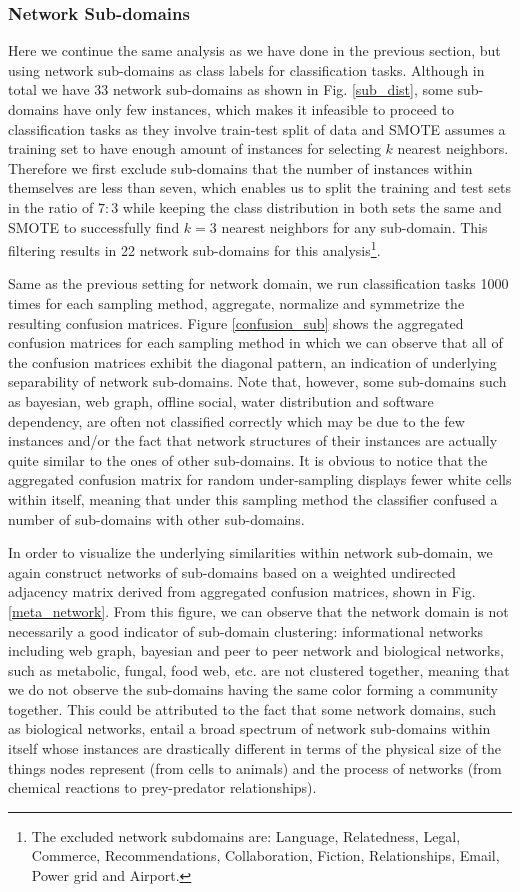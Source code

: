 \documentclass{article}
\begin{document}
\subsubsection{Network Sub-domains}
Here we continue the same analysis as we have done in the previous section, but using network sub-domains as class labels for classification tasks.
Although in total we have 33 network sub-domains as shown in Fig. \ref{sub_dist}, some sub-domains have only few instances, which makes it infeasible to proceed to classification tasks as they involve train-test split of data and SMOTE assumes a training set to have enough amount of instances for selecting $k$ nearest neighbors. Therefore we first exclude sub-domains that the number of instances within themselves are less than seven, which enables us to split the training and test sets in the ratio of $7:3$ while keeping the class distribution in both sets the same and SMOTE to successfully find $k=3$ nearest neighbors for any sub-domain. This filtering results in 22 network sub-domains for this analysis\footnote{The excluded network subdomains are: Language, Relatedness, Legal, Commerce, Recommendations, Collaboration, Fiction, Relationships, Email, Power grid and Airport.}. 

Same as the previous setting for network domain, we run classification tasks 1000 times for each sampling method, aggregate, normalize and symmetrize the resulting confusion matrices. Figure \ref{confusion_sub} shows the aggregated confusion matrices for each sampling method in which we can observe that all of the confusion matrices exhibit the diagonal pattern, an indication of underlying separability of network sub-domains. Note that, however, some sub-domains such as bayesian, web graph, offline social, water distribution and software dependency, are often not classified correctly which may be due to the few instances and/or the fact that network structures of their instances are actually quite similar to the ones of other sub-domains. It is obvious to notice that the aggregated confusion matrix for random under-sampling displays fewer white cells within itself, meaning that under this sampling method the classifier confused a number of sub-domains with other sub-domains.

In order to visualize the underlying similarities within network sub-domain, we again construct networks of sub-domains based on a weighted undirected adjacency matrix derived from aggregated confusion matrices, shown in Fig.\ref{meta_network}. From this figure, we can observe that the network domain is not necessarily a good indicator of sub-domain clustering: informational networks including web graph, bayesian and peer to peer network and biological networks, such as metabolic, fungal, food web, etc. are not clustered together, meaning that we do not observe the sub-domains having the same color forming a community together. This could be attributed to the fact that some network domains, such as biological networks, entail a broad spectrum of network sub-domains within itself whose instances are drastically different in terms of the physical size of the things nodes represent (from cells to animals) and the process of networks (from chemical reactions to prey-predator relationships). 
\end{document}
